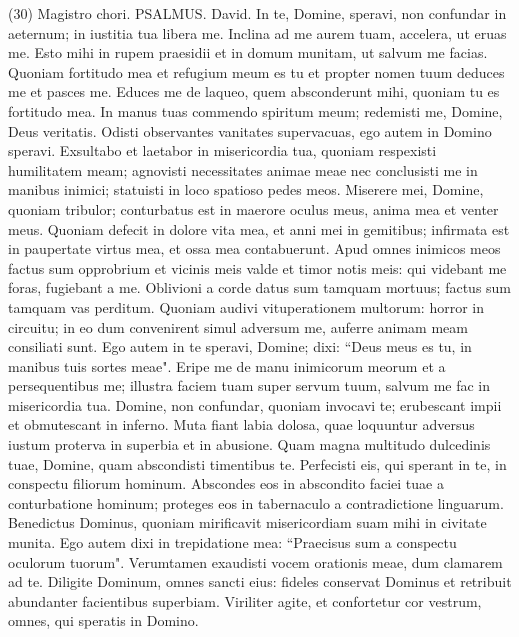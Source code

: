 \begin{biblechapter}  (30) 
\verse  Magistro chori. PSALMUS. David. 
\verse In te, Domine, speravi, non confundar in aeternum; in iustitia tua libera me. 
\verse Inclina ad me aurem tuam, accelera, ut eruas me. Esto mihi in rupem praesidii et in domum munitam, ut salvum me facias. 
\verse Quoniam fortitudo mea et refugium meum es tu et propter nomen tuum deduces me et pasces me. 
\verse Educes me de laqueo, quem absconderunt mihi, quoniam tu es fortitudo mea. 
\verse In manus tuas commendo spiritum meum; redemisti me, Domine, Deus veritatis. 
\verse Odisti observantes vanitates supervacuas, ego autem in Domino speravi. 
\verse Exsultabo et laetabor in misericordia tua, quoniam respexisti humilitatem meam; agnovisti necessitates animae meae 
\verse nec conclusisti me in manibus inimici; statuisti in loco spatioso pedes meos. 
\verse Miserere mei, Domine, quoniam tribulor; conturbatus est in maerore oculus meus, anima mea et venter meus. 
\verse Quoniam defecit in dolore vita mea, et anni mei in gemitibus; infirmata est in paupertate virtus mea, et ossa mea contabuerunt. 
\verse Apud omnes inimicos meos factus sum opprobrium et vicinis meis valde et timor notis meis: qui videbant me foras, fugiebant a me. 
\verse Oblivioni a corde datus sum tamquam mortuus; factus sum tamquam vas perditum. 
\verse Quoniam audivi vituperationem multorum: horror in circuitu; in eo dum convenirent simul adversum me, auferre animam meam consiliati sunt. 
\verse Ego autem in te speravi, Domine; dixi: “Deus meus es tu, 
\verse in manibus tuis sortes meae". Eripe me de manu inimicorum meorum et a persequentibus me; 
\verse illustra faciem tuam super servum tuum, salvum me fac in misericordia tua. 
\verse Domine, non confundar, quoniam invocavi te; erubescant impii et obmutescant in inferno. 
\verse Muta fiant labia dolosa, quae loquuntur adversus iustum proterva in superbia et in abusione. 
\verse Quam magna multitudo dulcedinis tuae, Domine, quam abscondisti timentibus te. Perfecisti eis, qui sperant in te, in conspectu filiorum hominum. 
\verse Abscondes eos in abscondito faciei tuae a conturbatione hominum; proteges eos in tabernaculo a contradictione linguarum. 
\verse Benedictus Dominus, quoniam mirificavit misericordiam suam mihi in civitate munita. 
\verse Ego autem dixi in trepidatione mea: “Praecisus sum a conspectu oculorum tuorum". Verumtamen exaudisti vocem orationis meae, dum clamarem ad te. 
\verse Diligite Dominum, omnes sancti eius: fideles conservat Dominus et retribuit abundanter facientibus superbiam. 
\verse Viriliter agite, et confortetur cor vestrum, omnes, qui speratis in Domino. 
\end{biblechapter}

